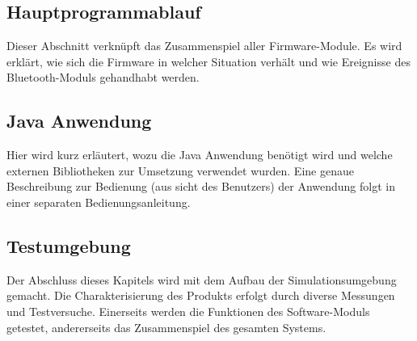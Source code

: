 \subsection{Hauptprogrammablauf}
Dieser Abschnitt verknüpft das Zusammenspiel aller Firmware-Module.
Es wird erklärt, wie sich die Firmware in welcher Situation verhält und wie Ereignisse des Bluetooth-Moduls gehandhabt werden.

\subsection{Java Anwendung}
Hier wird kurz erläutert, wozu die Java Anwendung benötigt wird und welche externen Bibliotheken zur Umsetzung verwendet wurden. Eine genaue Beschreibung zur Bedienung (aus sicht des Benutzers) der  Anwendung folgt in einer separaten Bedienungsanleitung.

\subsection{Testumgebung}
Der Abschluss dieses Kapitels wird mit dem Aufbau der Simulationsumgebung gemacht. Die Charakterisierung des Produkts erfolgt durch diverse Messungen und Testversuche. Einerseits werden die Funktionen des Software-Moduls getestet, andererseits das Zusammenspiel des gesamten Systems.